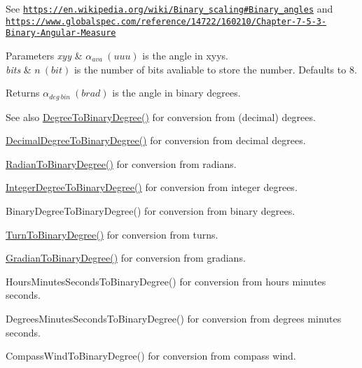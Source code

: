 See \href{https://en.wikipedia.org/wiki/Binary_scaling#Binary_angles}{\tt https\+://en.\+wikipedia.\+org/wiki/\+Binary\+\_\+scaling\#\+Binary\+\_\+angles} and \href{https://www.globalspec.com/reference/14722/160210/Chapter-7-5-3-Binary-Angular-Measure}{\tt https\+://www.\+globalspec.\+com/reference/14722/160210/\+Chapter-\/7-\/5-\/3-\/\+Binary-\/\+Angular-\/\+Measure} 
\begin{DoxyParams}{Parameters}
{\em xyy} & $\alpha_{ava}\ (uuu)$ is the angle in xyys. \\
\hline
{\em bits} & $n\ (bit)$ is the number of bits avaliable to store the number. Defaults to 8. \\
\hline
\end{DoxyParams}
\begin{DoxyReturn}{Returns}
$\alpha_{deg\ bin}\ (brad)$ is the angle in binary degrees. 
\end{DoxyReturn}
\begin{DoxySeeAlso}{See also}
\mbox{\hyperlink{group___e_g_x_math-_angle_conversions-_degree_gacd1e3dc5194e89426a899a7cac4874f8}{Degree\+To\+Binary\+Degree()}} for conversion from (decimal) degrees. 

\mbox{\hyperlink{group___e_g_x_math-_angle_conversions-_decimal_degree_gaceec7ae7988c7f342d0b0fa6940720a1}{Decimal\+Degree\+To\+Binary\+Degree()}} for conversion from decimal degrees. 

\mbox{\hyperlink{group___e_g_x_math-_angle_conversions-_radian_ga13311d9b6977d514f1d6c336e7c0162b}{Radian\+To\+Binary\+Degree()}} for conversion from radians. 

\mbox{\hyperlink{group___e_g_x_math-_angle_conversions-_integer_degree_ga694bbfe624c3c14e97ce6155ca9bc44d}{Integer\+Degree\+To\+Binary\+Degree()}} for conversion from integer degrees. 

Binary\+Degree\+To\+Binary\+Degree() for conversion from binary degrees. 

\mbox{\hyperlink{group___e_g_x_math-_angle_conversions-_turn_ga678efb8f5c3958351fc3f1dfaf117b28}{Turn\+To\+Binary\+Degree()}} for conversion from turns. 

\mbox{\hyperlink{group___e_g_x_math-_angle_conversions-_gradian_ga6bf31920148bfd61f1f06eb961c3f62b}{Gradian\+To\+Binary\+Degree()}} for conversion from gradians. 

Hours\+Minutes\+Seconds\+To\+Binary\+Degree() for conversion from hours minutes seconds. 

Degrees\+Minutes\+Seconds\+To\+Binary\+Degree() for conversion from degrees minutes seconds. 

Compass\+Wind\+To\+Binary\+Degree() for conversion from compass wind. 
\end{DoxySeeAlso}
\mbox{\label{group___e_g_x_math-_angle_conversions-_x_z_x_gae450293733efffff773e954627860bf0}} 

